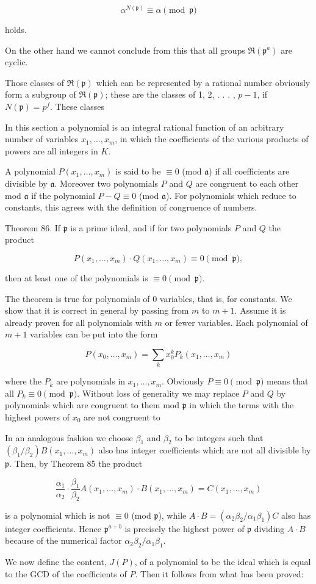 $$\alpha^{N(\mathfrak{p})} \equiv \alpha \pmod{\mathfrak{p}}$$

holds.

On the other hand we cannot conclude from this that all groups $\mathfrak{R}(\mathfrak{p}^a)$ are cyclic.

Those classes of $\mathfrak{R}(\mathfrak{p})$ which can be represented by a rational number obviously form a subgroup of $\mathfrak{R}(\mathfrak{p})$; these are the classes of 1, 2, . . . , $p - 1$, if $N(\mathfrak{p}) = p^f$. These classes

In this section a polynomial is an integral rational function of an arbitrary number of variables $x_1, \ldots, x_m$, in which the coefficients of the various products of powers are all integers in $K$.

A polynomial $P(x_1, \ldots, x_m)$ is said to be $\equiv 0$ (mod $\mathfrak{a}$) if all coefficients are divisible by $\mathfrak{a}$. Moreover two polynomials $P$ and $Q$ are congruent to each other mod $\mathfrak{a}$ if the polynomial $P - Q \equiv 0$ (mod $\mathfrak{a}$). For polynomials which reduce to constants, this agrees with the definition of congruence of numbers.

Theorem 86. If $\mathfrak{p}$ is a prime ideal, and if for two polynomials $P$ and $Q$ the product

$$P(x_1, \ldots, x_m) \cdot Q(x_1, \ldots, x_m) \equiv 0 \pmod{\mathfrak{p}},$$

then at least one of the polynomials is $\equiv 0 \pmod{\mathfrak{p}}$.

The theorem is true for polynomials of 0 variables, that is, for constants. We show that it is correct in general by passing from $m$ to $m + 1$. Assume it is already proven for all polynomials with $m$ or fewer variables. Each polynomial of $m + 1$ variables can be put into the form

$$P(x_0, \ldots, x_m) = \sum_k x_0^k P_k(x_1, \ldots, x_m)$$

where the $P_k$ are polynomials in $x_1, \ldots, x_m$. Obviously $P \equiv 0 \pmod{\mathfrak{p}}$ means that all $P_k \equiv 0 \pmod{\mathfrak{p}}$. Without loss of generality we may replace $P$ and $Q$ by polynomials which are congruent to them mod $\mathfrak{p}$ in which the terms with the highest powers of $x_0$ are not congruent to

In an analogous fashion we choose $\beta_1$ and $\beta_2$ to be integers such that $(\beta_1/\beta_2)B(x_1, \ldots, x_m)$ also has integer coefficients which are not all divisible by $\mathfrak{p}$. Then, by Theorem 85 the product

$$\frac{\alpha_1}{\alpha_2} \cdot \frac{\beta_1}{\beta_2} A(x_1, \ldots, x_m) \cdot B(x_1, \ldots, x_m) = C(x_1, \ldots, x_m)$$

is a polynomial which is not $\equiv 0$ (mod $\mathfrak{p}$), while $A \cdot B = (\alpha_2 \beta_2/\alpha_1 \beta_1)C$ also has integer coefficients. Hence $\mathfrak{p}^{a+b}$ is precisely the highest power of $\mathfrak{p}$ dividing $A \cdot B$ because of the numerical factor $\alpha_2 \beta_2/\alpha_1 \beta_1$.

We now define the content, $J(P)$, of a polynomial to be the ideal which is equal to the GCD of the coefficients of $P$. Then it follows from what has been proved:
